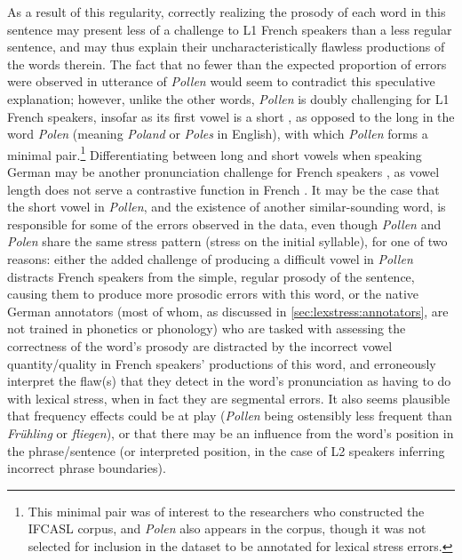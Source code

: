 			As a result of this regularity, correctly realizing the prosody of each word in this sentence may present less of a challenge to L1 French speakers than a less regular sentence, and may thus explain their uncharacteristically flawless productions of the words therein. The fact that no fewer than the expected proportion of errors were observed in utterance of \textit{Pollen} would seem to contradict this speculative explanation; however, unlike the other words, \textit{Pollen} is doubly challenging for L1 French speakers, insofar as its first vowel is a short , as opposed to the long  in the word \textit{Polen} (meaning \textit{Poland} or \textit{Poles} in English), with which \textit{Pollen} forms a minimal pair.\footnote{This minimal pair was of interest to the researchers who constructed the IFCASL corpus, and \textit{Polen} also appears in the corpus, though it was not selected for inclusion in the dataset to be annotated for lexical stress errors.}  Differentiating between long and short vowels when speaking German may be another pronunciation challenge for French speakers \citep{Zimmerer2015}, as vowel length does not serve a contrastive function in French \citep{Peperkamp2002}. It may be the case that the short vowel in \textit{Pollen}, and the existence of another similar-sounding word, is responsible for some of the errors observed in the data, even though \textit{Pollen} and \textit{Polen} share the same stress pattern (stress on the initial syllable), for one of two reasons: either the added challenge of producing a difficult vowel in \textit{Pollen} distracts French speakers from the simple, regular prosody of the sentence, causing them to produce more prosodic errors with this word, or the native German annotators (most of whom, as discussed in \cref{sec:lexstress:annotators}, are not trained in phonetics or phonology) who are tasked with assessing the correctness of the word's prosody are distracted by the incorrect vowel quantity/quality in French speakers' productions of this word, and erroneously interpret the flaw(s) that they detect in the word's pronunciation as having to do with lexical stress, when in fact they are segmental errors. 
			It also seems plausible that frequency effects could be at play (\textit{Pollen} being ostensibly less frequent than \textit{Frühling} or \textit{fliegen}), or that there may be an influence from the word's position in the phrase/sentence (or interpreted position, in the case of L2 speakers inferring incorrect phrase boundaries).
			
